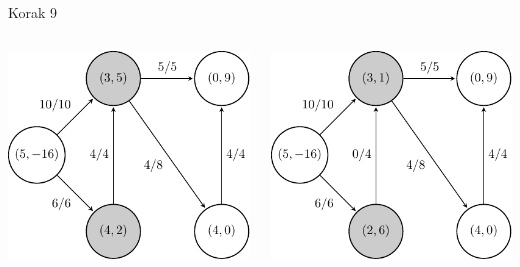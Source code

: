 \documentclass{beamer}
\begin{document}
\begin{frame}{Korak 9}
    \begin{columns}
        \begin{column}{0.5\textwidth}
            \centering
            \includegraphics[scale=0.7]{../writing/images/graf2-11.pdf}
        \end{column}

        \begin{column}{0.5\textwidth}
            \centering
            \includegraphics[scale=0.7]{../writing/images/graf2-10.pdf}
        \end{column}
    \end{columns}
\end{frame}
\end{document}
